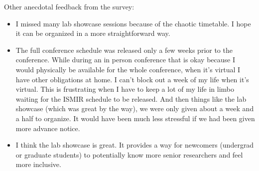 \documentclass[%
10pt,								%
]
{scrartcl}
\begin{document}
        Other anecdotal feedback from the survey:
        \begin{itemize}
            \item I missed many lab showcase sessions because of the chaotic timetable. I hope it can be organized in a more straightforward way.
            \item   The full conference schedule was released only a few weeks prior to the conference. While during an in person conference that is okay because I would physically be available for the whole conference, when it’s virtual I have other obligations at home. I can’t block out a week of my life when it’s virtual. This is frustrating when I have to keep a lot of my life in limbo waiting for the ISMIR schedule to be released. And then things like the lab showcase (which was great by the way), we were only given about a week and a half to organize. It would have been much less stressful if we had been given more advance notice.
            \item   I think the lab showcase is great. It provides a way for newcomers (undergrad or graduate students) to potentially know more senior researchers and feel more inclusive.
        \end{itemize}
            
\end{document}
